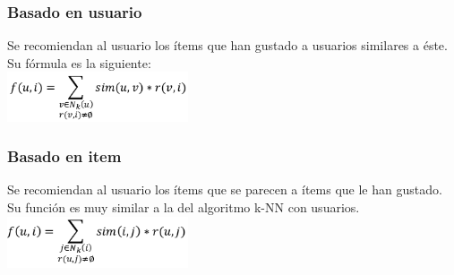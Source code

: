  	 \subsubsection{Basado en usuario}
 	 	Se recomiendan al usuario los ítems que han gustado a usuarios similares a éste. Su fórmula es la siguiente:  \cite{41}\\ 
 	 	\includegraphics[width=0.4\textwidth]{images/knn_user}

 	 \subsubsection{Basado en item}
 	 	Se recomiendan al usuario los ítems que se parecen a ítems que le han gustado. Su función es muy similar a la del algoritmo k-NN con usuarios.
 	 	\cite{41}\\
 	 	
 	 	\includegraphics[width=0.4\textwidth]{images/knn_item}
 	 
